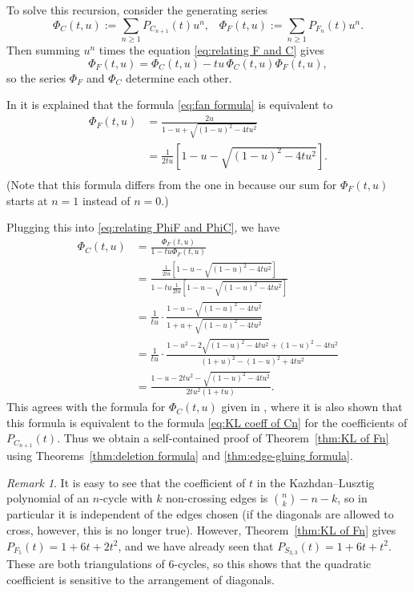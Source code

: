 \documentclass[12pt,reqno]{amsart}
\theoremstyle{definition}
\theoremstyle{remark}
\newtheorem{remark}[theorem]{Remark}
\renewcommand{\(}{\left(}
\renewcommand{\)}{\right)}
\newcommand{\<}{\left<}
\renewcommand{\>}{\right>}
\begin{document}
To solve this recursion, consider the generating series
\[\Phi_C(t,u) := \sum_{n\ge 1} P_{C_{n+1}}(t)u^n, \;\;\; \Phi_F(t,u) := \sum_{n\ge 1} P_{F_n}(t)u^n.\]
Then summing $u^n$ times the equation \eqref{eq:relating F and C} gives 
\begin{equation}\label{eq:relating PhiF and PhiC}
\Phi_F(t,u) = \Phi_C(t,u) - tu\,\Phi_C(t,u)\Phi_F(t,u),
\end{equation}
so the series $\Phi_F$ and $\Phi_C$ determine each other.

In \cite{LXY} it is explained that the formula
\eqref{eq:fan formula} is equivalent to 
\begin{align*}
\Phi_F(t,u) & = \frac{2u}{1-u + \sqrt{(1-u)^2 -4tu^2}} \\
& = \frac{1}{2tu}\left[1-u - \sqrt{(1-u)^2 -4tu^2}\right].\\
\end{align*}
(Note that this formula differs from the one in \cite{LXY} because our sum for $\Phi_F(t,u)$ starts at $n=1$ instead of $n=0$.)

Plugging this into \eqref{eq:relating PhiF and PhiC}, we have
\begin{align*}
\Phi_C(t,u) & = \frac{\Phi_F(t,u)}{1- tu\Phi_F(t,u)}\\
& = \frac{\frac{1}{2tu}\left[1-u - \sqrt{(1-u)^2 -4tu^2}\right]}{1 - tu\frac{1}{2tu}\left[1-u - \sqrt{(1-u)^2 -4tu^2}\right]}\\
& = \frac{1}{tu}\cdot \frac{1-u-\sqrt{(1-u)^2 -4tu^2}}{1+u+\sqrt{(1-u)^2 -4tu^2}}\\
&= \frac{1}{tu}\cdot  \frac{1-u^2 - 2\sqrt{(1-u)^2 -4tu^2} +(1-u)^2 - 4tu^2}{(1+u)^2 - (1-u)^2+4tu^2}\\
&=\frac{1-u-2tu^2 - \sqrt{(1-u)^2 -4tu^2}}{2tu^2(1+tu)}.
\end{align*}
This agrees with the formula for $\Phi_C(t,u)$ given in \cite{PWY}, where it is also shown that this formula is equivalent to the formula \eqref{eq:KL coeff of Cn} for the coefficients of $P_{C_{n+1}}(t)$.
Thus we obtain a self-contained proof of Theorem~\ref{thm:KL of Fn} using Theorems~\ref{thm:deletion formula} and \ref{thm:edge-gluing formula}.

\begin{remark}
It is easy to see that the coefficient of $t$ in the Kazhdan--Lusztig polynomial of an $n$-cycle with $k$ non-crossing edges is 
$\binom{n}{k} - n - k$, so in particular it is independent of the edges chosen (if the diagonals are allowed to cross, however, this is no longer true).   However, Theorem~\ref{thm:KL of Fn} gives $P_{F_5}(t) = 1 + 6t + 2t^2$, and we have already seen that $P_{S_{3,3}}(t) = 1 + 6t + t^2$.  These are both triangulations of $6$-cycles, so this shows that the quadratic coefficient is sensitive to the arrangement of diagonals.  
\end{remark}
\end{document}
